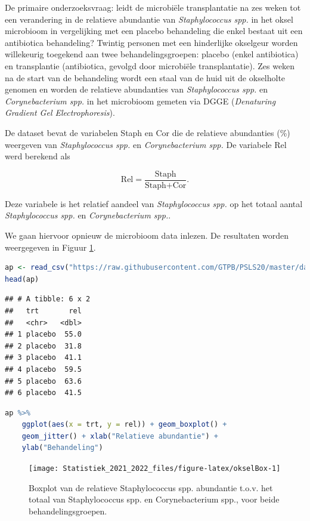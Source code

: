 \documentclass[
  12pt,dutch,coursenotes]{book}
\theoremstyle{definition}
\theoremstyle{definition}
\theoremstyle{definition}
\theoremstyle{definition}
\theoremstyle{remark}
\begin{document}
De primaire onderzoeksvraag: leidt de microbiële transplantatie na zes weken tot een verandering in de relatieve abundantie van \emph{Staphylococcus spp.} in het oksel microbioom in vergelijking met een placebo behandeling die enkel bestaat uit een antibiotica behandeling?
Twintig personen met een hinderlijke okselgeur worden willekeurig toegekend aan twee behandelingsgroepen: placebo (enkel antibiotica) en transplantie (antibiotica, gevolgd door microbiële transplantatie).
Zes weken na de start van de behandeling wordt een staal van de huid uit de okselholte genomen en worden de relatieve abundanties van \emph{Staphylococcus spp.} en \emph{Corynebacterium spp.} in het microbioom gemeten via DGGE (\emph{Denaturing Gradient Gel Electrophoresis}).

De dataset bevat de variabelen Staph en Cor die de relatieve abundanties (\%) weergeven van \emph{Staphylococcus spp.} en \emph{Corynebacterium spp.} De variabele Rel werd berekend als

\[
    \text{Rel}=\frac{\text{Staph}}{\text{Staph}+\text{Cor}}.
  \]

Deze variabele is het relatief aandeel van \emph{Staphylococcus spp.} op het totaal aantal \emph{Staphylococcus spp.} en \emph{Corynebacterium spp.}.

We gaan hiervoor opnieuw de microbioom data inlezen.
De resultaten worden weergegeven in Figuur \ref{fig:okselBox}.

\begin{lstlisting}[language=R]
ap <- read_csv("https://raw.githubusercontent.com/GTPB/PSLS20/master/data/armpit.csv")
head(ap)
\end{lstlisting}

\begin{lstlisting}
## # A tibble: 6 x 2
##   trt       rel
##   <chr>   <dbl>
## 1 placebo  55.0
## 2 placebo  31.8
## 3 placebo  41.1
## 4 placebo  59.5
## 5 placebo  63.6
## 6 placebo  41.5
\end{lstlisting}

\begin{lstlisting}[language=R]
ap %>%
    ggplot(aes(x = trt, y = rel)) + geom_boxplot() +
    geom_jitter() + xlab("Relatieve abundantie") +
    ylab("Behandeling")
\end{lstlisting}

\begin{figure}

{\centering \texttt{[image: Statistiek\_2021\_2022\_files/figure-latex/okselBox-1]} 

}

\caption{Boxplot van de relatieve Staphylococcus spp. abundantie t.o.v. het totaal van Staphylococcus spp. en Corynebacterium spp., voor beide behandelingsgroepen.}\label{fig:okselBox}
\end{figure}
\end{document}
